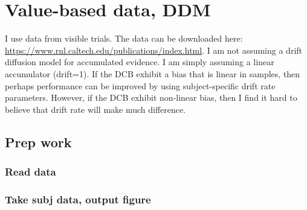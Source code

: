 \documentclass[
]{book}
\newenvironment{Shaded}{\begin{snugshade}}{\end{snugshade}}
\newcommand{\AttributeTok}[1]{\textcolor[rgb]{0.13,0.29,0.53}{#1}}
\newcommand{\CommentTok}[1]{\textcolor[rgb]{0.56,0.35,0.01}{\textit{#1}}}
\newcommand{\DecValTok}[1]{\textcolor[rgb]{0.00,0.00,0.81}{#1}}
\newcommand{\FunctionTok}[1]{\textcolor[rgb]{0.13,0.29,0.53}{\textbf{#1}}}
\newcommand{\NormalTok}[1]{#1}
\newcommand{\OtherTok}[1]{\textcolor[rgb]{0.56,0.35,0.01}{#1}}
\newcommand{\SpecialCharTok}[1]{\textcolor[rgb]{0.81,0.36,0.00}{\textbf{#1}}}
\newcommand{\StringTok}[1]{\textcolor[rgb]{0.31,0.60,0.02}{#1}}
\begin{document}
\hypertarget{value-based-data-ddm}{%
\section{Value-based data, DDM}\label{value-based-data-ddm}}

I use data from \citep{eum2022} visible trials. The data can be downloaded here: \url{https://www.rnl.caltech.edu/publications/index.html}. I am not assuming a drift diffusion model for accumulated evidence. I am simply assuming a linear accumulator (drift=1). If the DCB exhibit a bias that is linear in samples, then perhaps performance can be improved by using subject-specific drift rate parameters. However, if the DCB exhibit non-linear bias, then I find it hard to believe that drift rate will make much difference.

\hypertarget{prep-work-2}{%
\subsection{Prep work}\label{prep-work-2}}

\hypertarget{read-data}{%
\subsubsection*{Read data}\label{read-data}}

\begin{Shaded}
\end{Shaded}

\hypertarget{take-subj-data-output-figure-1}{%
\subsubsection*{Take subj data, output figure}\label{take-subj-data-output-figure-1}}
\end{document}
